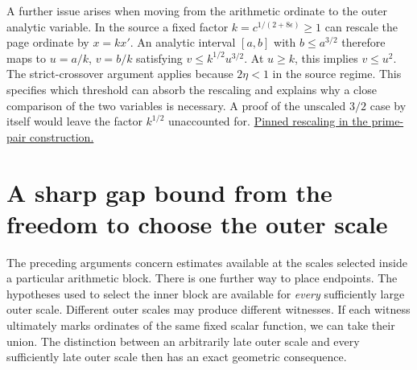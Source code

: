 \documentclass[12pt,letterpaper]{article}
\begin{document}
A further issue arises when moving from the arithmetic ordinate to the outer analytic variable. In the source a fixed factor $k=c^{1/(2+8\epsilon)}\geq1$ can rescale the page ordinate by $x=kx'$. An analytic interval $[a,b]$ with $b\leq a^{3/2}$ therefore maps to $u=a/k$, $v=b/k$ satisfying $v\leq k^{1/2}u^{3/2}$. At $u\geq k$, this implies $v\leq u^2$. The strict-crossover argument applies because $2\eta<1$ in the source regime. This specifies which threshold can absorb the rescaling and explains why a close comparison of the two variables is necessary. A proof of the unscaled $3/2$ case by itself would leave the factor $k^{1/2}$ unaccounted for. \href{https://github.com/nousentllc/riemann-hypothesis/blob/40e56bab026552e089d7afcfeff08d2defb9c005/src/Development/AutomorphicArithmetic/CharacterBoxes/WinPairs.lean}{Pinned rescaling in the prime-pair construction.}


\section{A sharp gap bound from the freedom to choose the outer scale}
\label{sec:outer-endpoint-gap}
The preceding arguments concern estimates available at the scales selected inside a particular arithmetic block. There is one further way to place endpoints. The hypotheses used to select the inner block are available for \emph{every} sufficiently large outer scale. Different outer scales may produce different witnesses. If each witness ultimately marks ordinates of the same fixed scalar function, we can take their union. The distinction between an arbitrarily late outer scale and every sufficiently late outer scale then has an exact geometric consequence.
\end{document}
